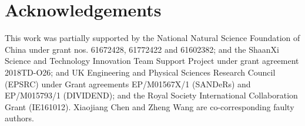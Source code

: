 \section{Acknowledgements}
This work was partially supported by the National Natural Science Foundation of China under grant nos. 61672428, 61772422 and 61602382; and
the ShaanXi Science and Technology Innovation Team Support Project under grant agreement 2018TD-O26; and UK Engineering and Physical
Sciences Research Council (EPSRC) under Grant agreements EP/M01567X/1 (SANDeRs) and EP/M015793/1 (DIVIDEND); and the Royal Society
International Collaboration Grant (IE161012). Xiaojiang Chen and Zheng Wang are co-corresponding faulty authors.
